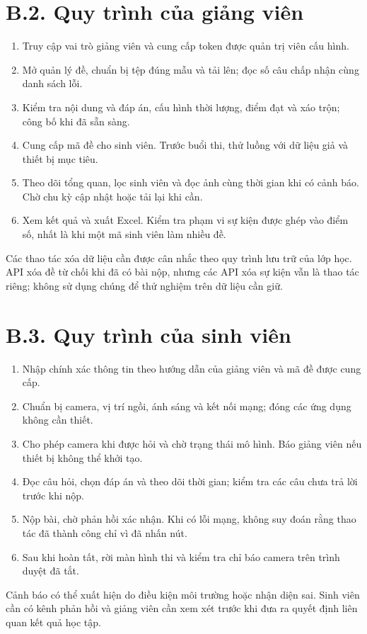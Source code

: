 \section*{B.2. Quy trình của giảng viên}
\begin{enumerate}
\item Truy cập vai trò giảng viên và cung cấp token được quản trị viên cấu hình.
\item Mở quản lý đề, chuẩn bị tệp đúng mẫu và tải lên; đọc số câu chấp nhận cùng danh sách lỗi.
\item Kiểm tra nội dung và đáp án, cấu hình thời lượng, điểm đạt và xáo trộn; công bố khi đã sẵn sàng.
\item Cung cấp mã đề cho sinh viên. Trước buổi thi, thử luồng với dữ liệu giả và thiết bị mục tiêu.
\item Theo dõi tổng quan, lọc sinh viên và đọc ảnh cùng thời gian khi có cảnh báo. Chờ chu kỳ cập nhật hoặc tải lại khi cần.
\item Xem kết quả và xuất Excel. Kiểm tra phạm vi sự kiện được ghép vào điểm số, nhất là khi một mã sinh viên làm nhiều đề.
\end{enumerate}
Các thao tác xóa dữ liệu cần được cân nhắc theo quy trình lưu trữ của lớp học. API xóa đề từ chối khi đã có bài nộp, nhưng các API xóa sự kiện vẫn là thao tác riêng; không sử dụng chúng để thử nghiệm trên dữ liệu cần giữ.

\section*{B.3. Quy trình của sinh viên}
\begin{enumerate}
\item Nhập chính xác thông tin theo hướng dẫn của giảng viên và mã đề được cung cấp.
\item Chuẩn bị camera, vị trí ngồi, ánh sáng và kết nối mạng; đóng các ứng dụng không cần thiết.
\item Cho phép camera khi được hỏi và chờ trạng thái mô hình. Báo giảng viên nếu thiết bị không thể khởi tạo.
\item Đọc câu hỏi, chọn đáp án và theo dõi thời gian; kiểm tra các câu chưa trả lời trước khi nộp.
\item Nộp bài, chờ phản hồi xác nhận. Khi có lỗi mạng, không suy đoán rằng thao tác đã thành công chỉ vì đã nhấn nút.
\item Sau khi hoàn tất, rời màn hình thi và kiểm tra chỉ báo camera trên trình duyệt đã tắt.
\end{enumerate}
Cảnh báo có thể xuất hiện do điều kiện môi trường hoặc nhận diện sai. Sinh viên cần có kênh phản hồi và giảng viên cần xem xét trước khi đưa ra quyết định liên quan kết quả học tập.

